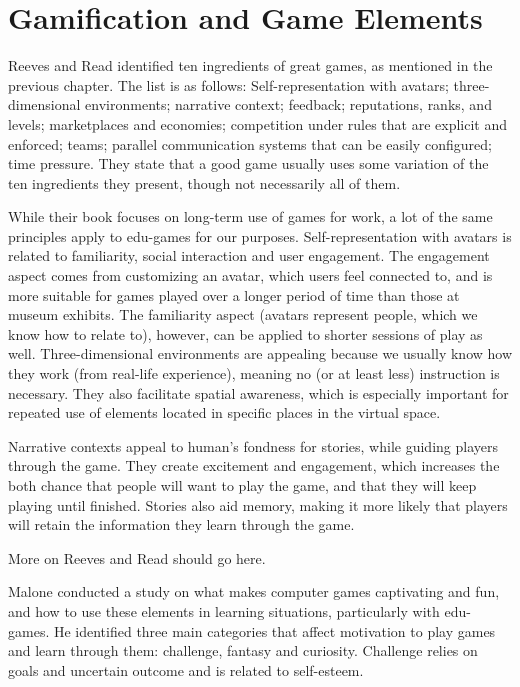 
\section{Gamification and Game Elements}

Reeves and Read\citep{Reeves} identified ten ingredients of great games, as mentioned in the previous chapter. The list is as follows: Self-representation with avatars; three-dimensional environments; narrative context; feedback; reputations, ranks, and levels; marketplaces and economies; competition under rules that are explicit and enforced; teams; parallel communication systems that can be easily configured; time pressure. They state that a good game usually uses some variation of the ten ingredients they present, though not necessarily all of them.

While their book focuses on long-term use of games for work, a lot of the same principles apply to edu-games for our purposes. Self-representation with avatars is related to familiarity, social interaction and user engagement. The engagement aspect comes from customizing an avatar, which users feel connected to, and is more suitable for games played over a longer period of time than those at museum exhibits. The familiarity aspect (avatars represent people, which we know how to relate to), however, can be applied to shorter sessions of play as well. Three-dimensional environments are appealing because we usually know how they work (from real-life experience), meaning no (or at least less) instruction is necessary. They also facilitate spatial awareness, which is especially important for repeated use of elements located in specific places in the virtual space.

Narrative contexts appeal to human's fondness for stories, while guiding players through the game. They create excitement and engagement, which increases the both chance that people will want to play the game, and that they will keep playing until finished. Stories also aid memory, making it more likely that players will retain the information they learn through the game.

More on Reeves and Read should go here.

Malone\citep{Malone} conducted a study on what makes computer games captivating and fun, and how to use these elements in learning situations, particularly with edu-games. He identified three main categories that affect motivation to play games and learn through them: challenge, fantasy and curiosity. Challenge relies on goals and uncertain outcome and is related to self-esteem.

